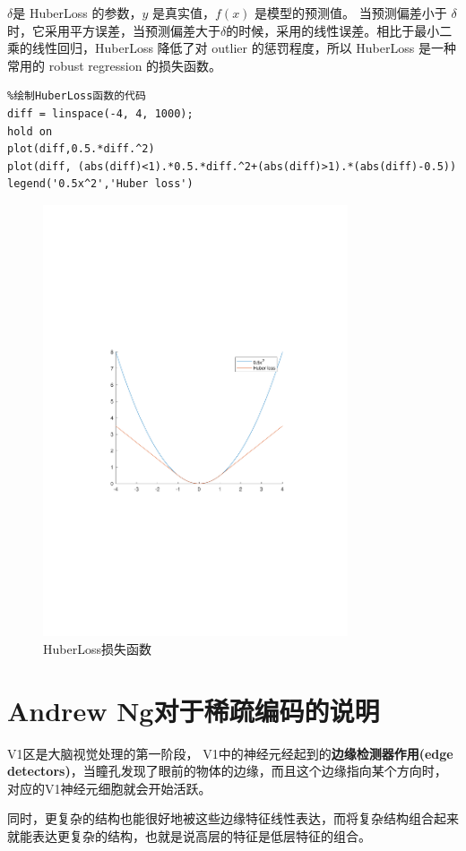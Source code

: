 $\delta$是 HuberLoss 的参数，$y$ 是真实值，$f(x)$ 是模型的预测值。
当预测偏差小于 $\delta $时，它采用平方误差，当预测偏差大于$\delta$的时候，采用的线性误差。相比于最小二乘的线性回归，HuberLoss 降低了对 outlier 的惩罚程度，所以 HuberLoss 是一种常用的 robust regression 的损失函数。
\begin{verbatim}
%绘制HuberLoss函数的代码
diff = linspace(-4, 4, 1000);
hold on
plot(diff,0.5.*diff.^2)
plot(diff, (abs(diff)<1).*0.5.*diff.^2+(abs(diff)>1).*(abs(diff)-0.5))
legend('0.5x^2','Huber loss')
\end{verbatim}
\begin{figure}[H]
\centering
\includegraphics[width=9cm]{fig/HuberLoss.pdf}
\caption{HuberLoss损失函数}
\end{figure}

\section{Andrew Ng对于稀疏编码的说明}
V1区是大脑视觉处理的第一阶段，
V1中的神经元经起到的\textbf{边缘检测器作用(edge detectors)}，当瞳孔发现了眼前的物体的边缘，而且这个边缘指向某个方向时，对应的V1神经元细胞就会开始活跃。

同时，更复杂的结构也能很好地被这些边缘特征线性表达，而将复杂结构组合起来就能表达更复杂的结构，也就是说高层的特征是低层特征的组合。

